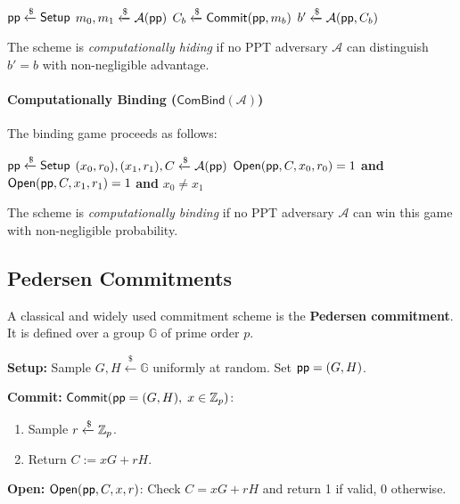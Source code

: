 \documentclass[11pt]{article}
\begin{document}
\begin{algorithm}
\caption{$\mathsf{ComHide}_b(\mathcal{A})$}
\begin{algorithmic}[1]
  \State $\mathsf{pp} \xleftarrow{\$} \mathsf{Setup}$
  \State $m_0, m_1 \xleftarrow{\$} \mathcal{A}(\mathsf{pp})$
  \State $C_b \xleftarrow{\$} \mathsf{Commit}(\mathsf{pp}, m_b)$
  \State $b' \xleftarrow{\$} \mathcal{A}(\mathsf{pp}, C_b)$
\end{algorithmic}
\end{algorithm}

\noindent The scheme is \emph{computationally hiding} if no PPT adversary $\mathcal{A}$ can distinguish $b' = b$ with non-negligible advantage.

\paragraph{Computationally Binding ($\mathsf{ComBind}(\mathcal{A})$)}
The binding game proceeds as follows:

\begin{algorithm}
\caption{$\mathsf{ComBind}(\mathcal{A})$}
\begin{algorithmic}[1]
  \State $\mathsf{pp} \xleftarrow{\$} \mathsf{Setup}$
  \State $(x_0, r_0), (x_1, r_1), C \xleftarrow{\$} \mathcal{A}(\mathsf{pp})$
  \State \Return $\mathsf{Open}(\mathsf{pp}, C, x_0, r_0) = 1$ \textbf{and} $\mathsf{Open}(\mathsf{pp}, C, x_1, r_1) = 1$ \textbf{and} $x_0 \neq x_1$
\end{algorithmic}
\end{algorithm}

\noindent The scheme is \emph{computationally binding} if no PPT adversary $\mathcal{A}$ can win this game with non-negligible probability.

\subsection{Pedersen Commitments}

A classical and widely used commitment scheme is the \textbf{Pedersen commitment}.  It is defined over a group $\mathbb{G}$ of prime order $p$.

\begin{tcolorbox}[colback=green!5!white, colframe=green!50!black, fonttitle=\bfseries,
                  title={Pedersen Commitment Scheme}]
\textbf{Setup:} Sample $G, H \xleftarrow{\$} \mathbb{G}$ uniformly at random.  Set $\mathsf{pp} = (G, H)$.

\medskip
\textbf{Commit:} $\mathsf{Commit}(\mathsf{pp} = (G,H),\; x \in \mathbb{Z}_p)$:
\begin{enumerate}
  \item Sample $r \xleftarrow{\$} \mathbb{Z}_p$.
  \item Return $C := xG + rH$.
\end{enumerate}

\medskip
\textbf{Open:} $\mathsf{Open}(\mathsf{pp}, C, x, r)$: Check $C = xG + rH$ and return 1 if valid, 0 otherwise.
\end{tcolorbox}
\end{document}
